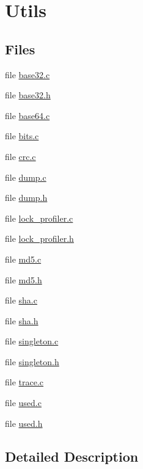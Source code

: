 \hypertarget{group__utils}{\section{Utils}
\label{group__utils}
}
\subsection*{Files}
\begin{DoxyCompactItemize}
\item 
file \hyperlink{base32_8c}{base32.\-c}
\item 
file \hyperlink{base32_8h}{base32.\-h}
\item 
file \hyperlink{base64_8c}{base64.\-c}
\item 
file \hyperlink{bits_8c}{bits.\-c}
\item 
file \hyperlink{crc_8c}{crc.\-c}
\item 
file \hyperlink{dump_8c}{dump.\-c}
\item 
file \hyperlink{dump_8h}{dump.\-h}
\item 
file \hyperlink{lock__profiler_8c}{lock\-\_\-profiler.\-c}
\item 
file \hyperlink{lock__profiler_8h}{lock\-\_\-profiler.\-h}
\item 
file \hyperlink{md5_8c}{md5.\-c}
\item 
file \hyperlink{md5_8h}{md5.\-h}
\item 
file \hyperlink{sha_8c}{sha.\-c}
\item 
file \hyperlink{sha_8h}{sha.\-h}
\item 
file \hyperlink{singleton_8c}{singleton.\-c}
\item 
file \hyperlink{singleton_8h}{singleton.\-h}
\item 
file \hyperlink{trace_8c}{trace.\-c}
\item 
file \hyperlink{used_8c}{used.\-c}
\item 
file \hyperlink{used_8h}{used.\-h}
\end{DoxyCompactItemize}


\subsection{Detailed Description}
